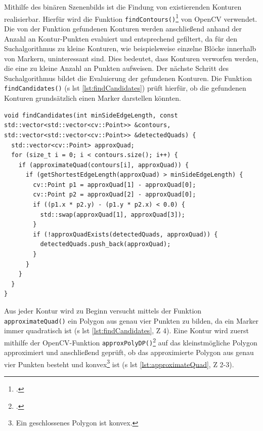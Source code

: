 \noindent Mithilfe des binären Szenenbilds ist die Findung von existierenden Konturen realisierbar. Hierfür wird die Funktion \texttt{findContours()}\footcite{opencvfindContours} von OpenCV verwendet. Die von der Funktion gefundenen Konturen werden anschließend anhand der Anzahl an Kontur-Punkten evaluiert und entsprechend gefiltert, da für den Suchalgorithmus zu kleine Konturen, wie beispielsweise einzelne Blöcke innerhalb von Markern, uninteressant sind. Dies bedeutet, dass Konturen verworfen werden, die eine zu kleine Anzahl an Punkten aufweisen. Der nächste Schritt des Suchalgorithmus bildet die Evaluierung der gefundenen Konturen. Die Funktion \texttt{findCandidates()} (\acs{s} \acs{lst} \ref{lst:findCandidates}) prüft hierfür, ob die gefundenen Konturen grundsätzlich einen Marker darstellen könnten.

\begin{lstlisting}[caption={Die Funktion \texttt{detectormarkerbased.cpp/findCandidates()} evaluiert, ob die übergebenen Konturen grundsätzlich einen Marker darstellen könnten}, label={lst:findCandidates}]
void findCandidates(int minSideEdgeLength, const std::vector<std::vector<cv::Point>> &contours, std::vector<std::vector<cv::Point>> &detectedQuads) {
  std::vector<cv::Point> approxQuad;
  for (size_t i = 0; i < contours.size(); i++) {
    if (approximateQuad(contours[i], approxQuad)) {
      if (getShortestEdgeLength(approxQuad) > minSideEdgeLength) {
        cv::Point p1 = approxQuad[1] - approxQuad[0];
        cv::Point p2 = approxQuad[2] - approxQuad[0];
        if ((p1.x * p2.y) - (p1.y * p2.x) < 0.0) {
          std::swap(approxQuad[1], approxQuad[3]);
        }
        if (!approxQuadExists(detectedQuads, approxQuad)) {
          detectedQuads.push_back(approxQuad);
        }
      }
    }
  }
}
\end{lstlisting}

\noindent Aus jeder Kontur wird zu Beginn versucht mittels der Funktion \texttt{approximateQuad()} ein Polygon aus genau vier Punkten zu bilden, da ein Marker immer quadratisch ist (\acs{s} \acs{lst} \ref{lst:findCandidates}, \acs{Z} 4). Eine Kontur wird zuerst mithilfe der OpenCV-Funktion \texttt{approxPolyDP()}\footcite{opencvapproxPolyDP} auf das kleinstmögliche Polygon approximiert und anschließend geprüft, ob das approximierte Polygon aus genau vier Punkten besteht und konvex\footnote{Ein geschlossenes Polygon ist konvex.} ist (\acs{s} \acs{lst} \ref{lst:approximateQuad}, \acs{Z} 2-3).

\newpage

